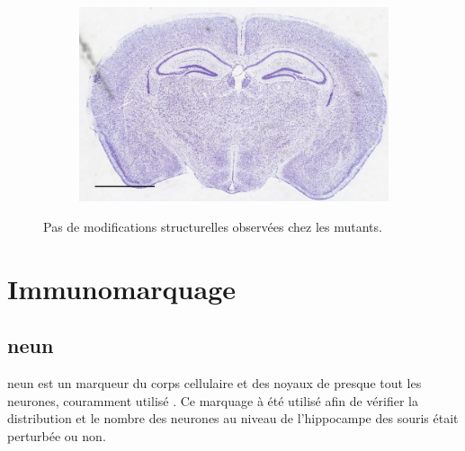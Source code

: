 \begin{figure}[h]
\begin{center}
\begin{subfigure}[h]{0.49\textwidth}
			\end{subfigure}
			\begin{subfigure}[h]{0.49\textwidth}%
				\caption{}
				\label{fig:MaleMutNissl}
				\includegraphics[width=\textwidth]{./Images/Nissl/MaleMut.jpg}
			\end{subfigure}
		\end{center}
		\caption{Pas de modifications structurelles observées chez les mutants.}
		\label{fig:NisslResultat}
	\end{figure}

\section{Immunomarquage}
\label{sec:IHC}

	\subsection{\acrshort{neun}}
	\label{ssec:neun}
	\Acrshort{neun} est un marqueur du  corps cellulaire et des noyaux de presque tout les neurones, couramment utilisé \cite{Guselnikova2015}. Ce marquage à été utilisé afin de vérifier la distribution et le nombre des neurones au niveau de l'hippocampe des souris \mcrd était perturbée ou non.
	
